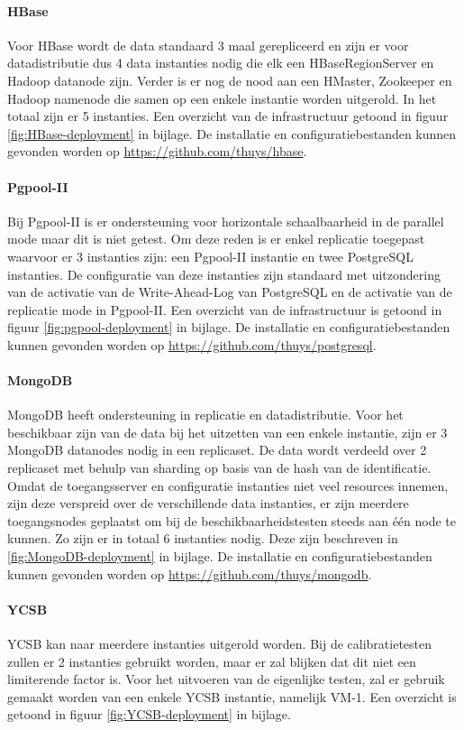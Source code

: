 \paragraph{HBase} Voor HBase wordt de data standaard 3 maal gerepliceerd en zijn er voor datadistributie dus 4 data instanties nodig die elk een HBaseRegionServer en Hadoop datanode zijn. Verder is er nog de nood aan een HMaster, Zookeeper en Hadoop namenode die samen op een enkele instantie worden uitgerold. In het totaal zijn er 5 instanties. Een overzicht van de infrastructuur getoond in figuur \ref{fig:HBase-deployment} in bijlage. De installatie en configuratiebestanden kunnen gevonden worden op \url{https://github.com/thuys/hbase}. 

\paragraph{Pgpool-II} Bij Pgpool-II is er ondersteuning voor horizontale schaalbaarheid in de parallel mode maar dit is niet getest. Om deze reden is er enkel replicatie toegepast waarvoor er 3 instanties zijn: een Pgpool-II instantie en twee PostgreSQL instanties. De configuratie van deze instanties zijn standaard met uitzondering van de activatie van de Write-Ahead-Log van PostgreSQL en de activatie van de replicatie mode in Pgpool-II. Een overzicht van de infrastructuur is getoond in figuur \ref{fig:pgpool-deployment} in bijlage. De installatie en configuratiebestanden kunnen gevonden worden op \url{https://github.com/thuys/postgresql}.

\paragraph{MongoDB} MongoDB heeft ondersteuning in replicatie en datadistributie. Voor het beschikbaar zijn van de data bij het uitzetten van een enkele instantie, zijn er 3 MongoDB datanodes nodig in een replicaset. De data wordt verdeeld over 2 replicaset met behulp van sharding op basis van de hash van de identificatie. Omdat de toegangsserver en configuratie instanties niet veel resources innemen, zijn deze verspreid over de verschillende data instanties, er zijn meerdere toegangsnodes geplaatst om bij de beschikbaarheidstesten steeds aan één node te kunnen. Zo zijn er in totaal 6 instanties nodig. Deze zijn beschreven in \ref{fig:MongoDB-deployment} in bijlage. De installatie en configuratiebestanden kunnen gevonden worden op \url{https://github.com/thuys/mongodb}.

\paragraph{YCSB} YCSB kan naar meerdere instanties uitgerold worden. Bij de calibratietesten zullen er 2 instanties gebruikt worden, maar er zal blijken dat dit niet een limiterende factor is. Voor het uitvoeren van de eigenlijke testen, zal er gebruik gemaakt worden van een enkele YCSB instantie, namelijk VM-1.  Een overzicht is getoond in figuur \ref{fig:YCSB-deployment} in bijlage. 


